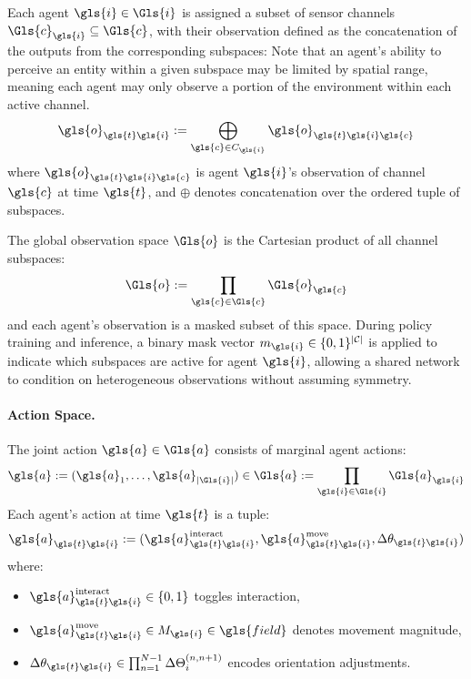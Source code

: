 \documentclass[]{jair}
\begin{document}
Each agent \(\gls{i} \in\Gls{i}\) is assigned a subset of sensor channels 
\(\Gls{c}_{\gls{i}} \subseteq \Gls{c}\), %
with their observation defined as the concatenation of the outputs 
from the corresponding subspaces:
Note that an agent's ability to perceive an entity within a given 
subspace may be limited by spatial range, meaning each agent may 
only observe a portion of the environment within each active channel.
\[
    \gls{o}_{\gls{t}\gls{i}} 
    := \bigoplus_{\gls{c} \in {C}_{\gls{i}}} \gls{o}_{\gls{t}\gls{i}\gls{c}}
\]
where \(\gls{o}_{\gls{t}\gls{i}\gls{c}}\) is agent \(\gls{i}\)'s 
observation of channel \(\gls{c}\) at time \(\gls{t}\), 
and \(\oplus\) denotes concatenation over the ordered tuple of subspaces.

The global observation space \(\Gls{o}\) is the Cartesian product of all channel subspaces:
\[
    \Gls{o} := \prod_{\gls{c}\in{\Gls{c}}} \Gls{o}_{\gls{c}}
\]
and each agent's observation is a masked subset of this space.
During policy training and inference, a binary mask vector 
\(m_{\gls{i}} \in \{0,1\}^{|\mathcal{C}|}\) is applied to 
indicate which subspaces are active for agent \(\gls{i}\), 
allowing a shared network to condition on heterogeneous 
observations without assuming symmetry.

\paragraph{Action Space.} 
The joint action \(\gls{a}\in\Gls{a}\) %
consists of marginal agent actions:
\[
    \gls{a} := (\gls{a}_1, \ldots, \gls{a}_{|\Gls{i}|})\in\Gls{a} 
    := \prod_{\gls{i}\in\Gls{i}} \Gls{a}_{\gls{i}}
\]
Each agent's action at time \(\gls{t}\) is a tuple:
\[
    \gls{a}_{\gls{t}\gls{i}} := (\gls{a}_{\gls{t}\gls{i}}^\text{interact}, 
        \gls{a}_{\gls{t}\gls{i}}^\text{move}, \Delta\theta_{\gls{t}\gls{i}})
\]
where:
\begin{itemize}
    \item \(\gls{a}_{\gls{t}\gls{i}}^\text{interact}\in\{0,1\}\) toggles interaction,
    \item \(\gls{a}_{\gls{t}\gls{i}}^\text{move} \in M_{\gls{i}}\in\gls{field}\) 
    denotes movement magnitude,
    \item \(\Delta\theta_{\gls{t}\gls{i}} \in \prod_{n=1}^{N-1} \Delta\Theta_i^{(n,n+1)}\)
    encodes orientation adjustments.
\end{itemize}
\end{document}
